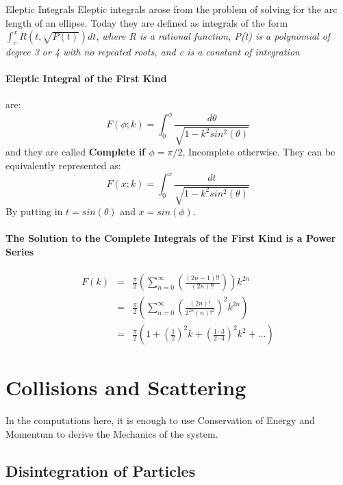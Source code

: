 \begin{definition}{Eleptic Integrals}{}
    Eleptic integrals arose from the problem of solving for the arc length of an ellipse.
    Today they are defined as integrals of the form $ \int^x_c R(t, \sqrt{P(t)}) dt $, 
    \textit{where R is a rational function, P(t) is a polynomial of degree 3 or 4 with no 
    repeated roots, and c is a constant of integration}

    \paragraph{Eleptic Integral of the First Kind} are:
    \begin{equation}
        F(\phi; k) = \int^{\phi}_0 \frac{d\theta}{\sqrt{1 - k^2 sin^2(\theta)}}
    \end{equation}
    and they are called \textbf{Complete if $\phi = \pi/2$}, Incomplete otherwise.
    They can be equivalently represented as:
    \begin{equation}
        F(x; k) = \int^x_0 \frac{dt}{\sqrt{1-k^2 sin^2(\theta)}}
    \end{equation}
    By putting in $ t = sin(\theta) $ and $ x = sin(\phi) $.

    \paragraph{The Solution to the Complete Integrals of the First Kind is a Power Series}
    \begin{eqnarray}
        F(k) &=& \frac{\pi}{2} (\sum_{n=0}^{\infty} (\frac{(2n-1)!!}{(2n)!!}))k^{2n} \\
             &=& \frac{\pi}{2} (\sum_{n=0}^{\infty} (\frac{(2n)!}{2^{2n} (n)!^2})^2 k^{2n}) \\
             &=& \frac{\pi}{2} (1 + (\frac{1}{2})^2 k + (\frac{1 \cdot 3}{2 \cdot 4})^2 k^{2} + ...)
    \end{eqnarray}
\end{definition}



\section{Collisions and Scattering}

In the computations here, it is enough to use Conservation of Energy and Momentum to derive the Mechanics of the system.

\subsection{Disintegration of Particles}

